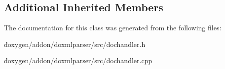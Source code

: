 \subsection*{Additional Inherited Members}


The documentation for this class was generated from the following files\+:\begin{DoxyCompactItemize}
\item 
doxygen/addon/doxmlparser/src/dochandler.\+h\item 
doxygen/addon/doxmlparser/src/dochandler.\+cpp\end{DoxyCompactItemize}
